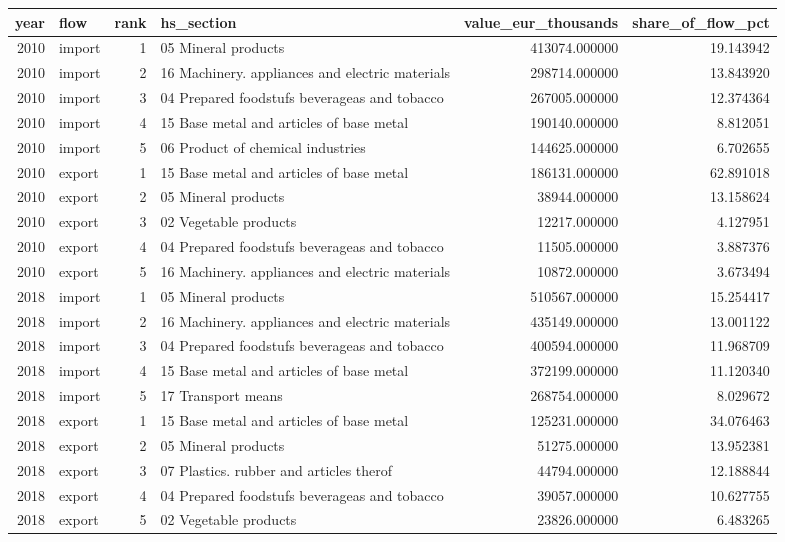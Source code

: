 \begin{tabular}{rlrlrr}
\toprule
year & flow & rank & hs_section & value_eur_thousands & share_of_flow_pct \\
\midrule
2010 & import & 1 & 05 Mineral products & 413074.000000 & 19.143942 \\
2010 & import & 2 & 16 Machinery. appliances and electric materials & 298714.000000 & 13.843920 \\
2010 & import & 3 & 04 Prepared foodstufs beverageas and tobacco & 267005.000000 & 12.374364 \\
2010 & import & 4 & 15 Base metal and articles of base metal & 190140.000000 & 8.812051 \\
2010 & import & 5 & 06 Product of chemical industries & 144625.000000 & 6.702655 \\
2010 & export & 1 & 15 Base metal and articles of base metal & 186131.000000 & 62.891018 \\
2010 & export & 2 & 05 Mineral products & 38944.000000 & 13.158624 \\
2010 & export & 3 & 02 Vegetable products & 12217.000000 & 4.127951 \\
2010 & export & 4 & 04 Prepared foodstufs beverageas and tobacco & 11505.000000 & 3.887376 \\
2010 & export & 5 & 16 Machinery. appliances and electric materials & 10872.000000 & 3.673494 \\
2018 & import & 1 & 05 Mineral products & 510567.000000 & 15.254417 \\
2018 & import & 2 & 16 Machinery. appliances and electric materials & 435149.000000 & 13.001122 \\
2018 & import & 3 & 04 Prepared foodstufs beverageas and tobacco & 400594.000000 & 11.968709 \\
2018 & import & 4 & 15 Base metal and articles of base metal & 372199.000000 & 11.120340 \\
2018 & import & 5 & 17 Transport means & 268754.000000 & 8.029672 \\
2018 & export & 1 & 15 Base metal and articles of base metal & 125231.000000 & 34.076463 \\
2018 & export & 2 & 05 Mineral products & 51275.000000 & 13.952381 \\
2018 & export & 3 & 07 Plastics. rubber and articles therof & 44794.000000 & 12.188844 \\
2018 & export & 4 & 04 Prepared foodstufs beverageas and tobacco & 39057.000000 & 10.627755 \\
2018 & export & 5 & 02 Vegetable products & 23826.000000 & 6.483265 \\

\end{tabular}
